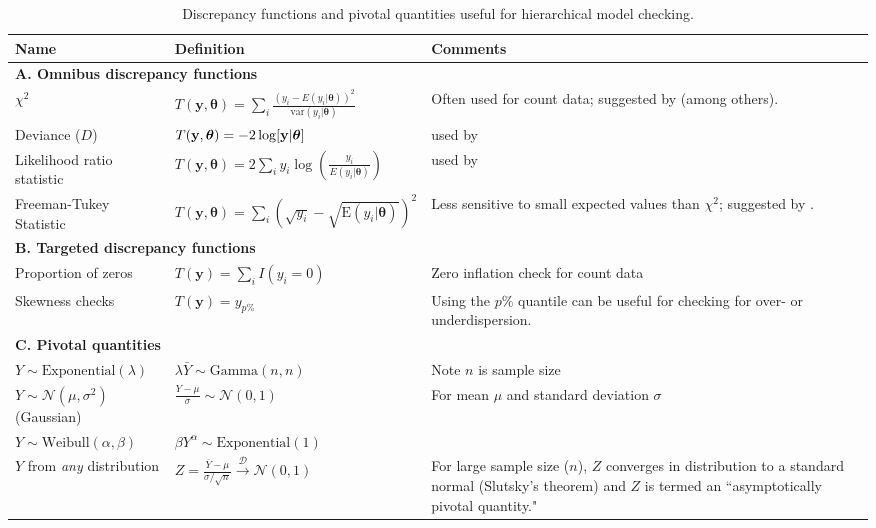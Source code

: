 \documentclass[12pt,english]{article}
\begin{document}
\begin{spacing}{1.9}
\begin{table}[ht]
\caption{Discrepancy functions and pivotal quantities useful for hierarchical model checking.
}
\label{tab:discrepancy}
\centering
\begin{tabular}{p{4cm}lp{5cm}}
  \hline
  Name & Definition & Comments \\
  \hline
  \multicolumn{3}{l}{\textbf{A. Omnibus discrepancy functions}} \\
  $\chi^2$ & $T(\textbf{y},\boldsymbol{\theta}) = \sum_i \frac{(y_i - E(y_i|\boldsymbol{\theta}))^2}{\textrm{var}(y_i|\boldsymbol{\theta})}$ & Often used for count data; suggested by \citet{GelmanEtAl2014} (among others).\\
  Deviance ($D$) &  $T(\textbf{y},\boldsymbol{\theta}) = -2 \log [{\bf y} | \boldsymbol{\theta}]$ & used by \citet{KingEtAl2009}\\
  Likelihood ratio statistic & $T(\textbf{y},\boldsymbol{\theta}) = 2 \sum_i y_i \log(\frac{y_i}{E(y_i|\boldsymbol{\theta})})$ & used by \citet{LunnEtAl2013} \\
  Freeman-Tukey Statistic & $T(\textbf{y},\boldsymbol{\theta})=\sum_i (\sqrt{y_i}-\sqrt{\textrm{E}(y_i|\boldsymbol{\theta})})^2$ & Less sensitive to small expected values than $\chi^2$; suggested by \citet{KeryRoyle2016}.\\
  \multicolumn{3}{l}{\textbf{B. Targeted discrepancy functions}} \\
  Proportion of zeros & $T(\textbf{y}) = \sum_i I(y_i = 0) $ & Zero inflation check for count data \\
  Skewness checks & $T(\textbf{y}) = y_{p\%} $ & Using the $p\%$ quantile can be useful for checking for over- or underdispersion. \\
  \multicolumn{3}{l}{\textbf{C. Pivotal quantities}} \\
  $Y  \sim \textrm{Exponential}(\lambda)$ & $\lambda \bar{Y} \sim \textrm{Gamma}(n,n)$ & Note $n$ is sample size\\
  $Y \sim \mathcal{N}(\mu,\sigma^2)$ (Gaussian) & $ \frac{Y - \mu}{\sigma} \sim \mathcal{N}(0,1) $ & For mean $\mu$ and standard deviation $\sigma$  \\
  $Y \sim \textrm{Weibull}(\alpha,\beta)$ & $ \beta Y^\alpha \sim \textrm{Exponential}(1) $ & \\
  $Y$ from {\it any} distribution & $Z = \frac{\bar{Y}-\mu}{\sigma/\sqrt{n}} \xrightarrow[]{\mathcal{D}} \mathcal{N}(0,1)$ & For large sample size ($n$), $Z$ converges in distribution to a standard normal (Slutsky's theorem) and $Z$ is termed an ``asymptotically pivotal quantity." \\
\hline
\end{tabular}
\end{table}



\end{spacing}
\end{document}
